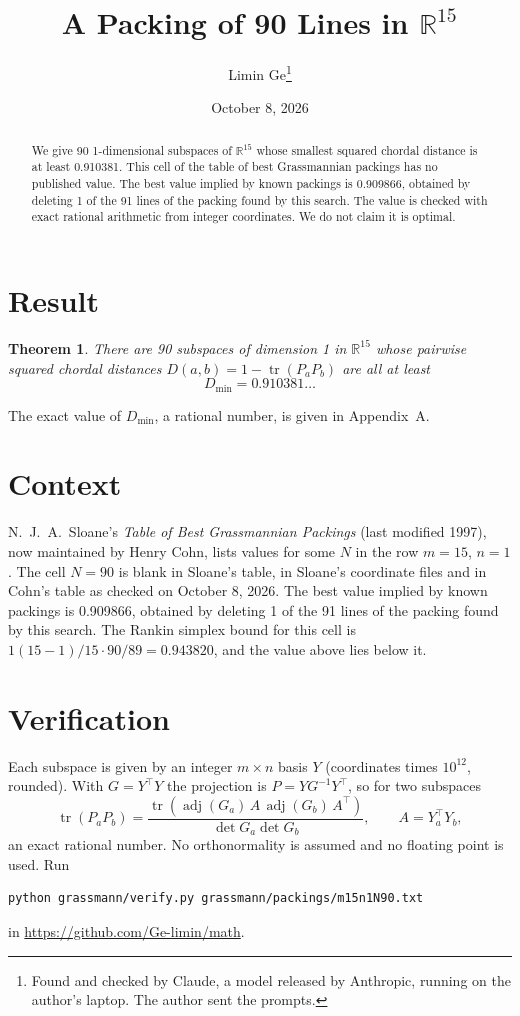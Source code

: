 \documentclass[11pt,a4paper]{article}
\title{A Packing of 90 Lines in $\mathbb{R}^{15}$}
\author{Limin Ge\thanks{Found and checked by Claude, a model released by Anthropic, running on the author's laptop. The author sent the prompts.}}
\date{October 8, 2026}
\newtheorem*{theorem}{Theorem}
\begin{document}
\maketitle
\begin{abstract}
We give 90 1-dimensional subspaces of $\mathbb{R}^{15}$ whose smallest squared chordal distance is at least 0.910381. This cell of the table of best Grassmannian packings has no published value. The best value implied by known packings is 0.909866, obtained by deleting 1 of the 91 lines of the packing found by this search. The value is checked with exact rational arithmetic from integer coordinates. We do not claim it is optimal.
\end{abstract}

\section{Result}
\begin{theorem}
There are 90 subspaces of dimension 1 in $\mathbb{R}^{15}$ whose pairwise squared chordal distances $D(a,b) = 1 - \operatorname{tr}(P_aP_b)$ are all at least
\[ D_{\min} = 0.910381\ldots \]
\end{theorem}
The exact value of $D_{\min}$, a rational number, is given in Appendix~A.


\section{Context}
N.~J.~A.~Sloane's \emph{Table of Best Grassmannian Packings} (last modified 1997), now maintained by Henry Cohn, lists values for some $N$ in the row $m=15$, $n=1$. The cell $N=90$ is blank in Sloane's table, in Sloane's coordinate files and in Cohn's table as checked on October 8, 2026. The best value implied by known packings is 0.909866, obtained by deleting 1 of the 91 lines of the packing found by this search. The Rankin simplex bound for this cell is $1(15-1)/15\cdot 90/89 = 0.943820$, and the value above lies below it.


\section{Verification}
Each subspace is given by an integer $m\times n$ basis $Y$ (coordinates times $10^{12}$, rounded). With $G=Y^\top Y$ the projection is $P=YG^{-1}Y^\top$, so for two subspaces
\[ \operatorname{tr}(P_aP_b)=\frac{\operatorname{tr}(\operatorname{adj}(G_a)\,A\,\operatorname{adj}(G_b)\,A^\top)}{\det G_a\det G_b},\qquad A=Y_a^\top Y_b, \]
an exact rational number. No orthonormality is assumed and no floating point is used. Run
\begin{verbatim}
python grassmann/verify.py grassmann/packings/m15n1N90.txt
\end{verbatim}
in \url{https://github.com/Ge-limin/math}.
\end{document}
